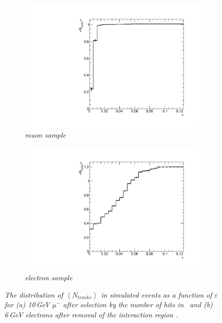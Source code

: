 \begin{figure}[H]
	\centering
	\begin{subfigure}{0.5\textwidth}
		\centering
		\includegraphics[width=.90\linewidth]{ECAL/plots/muon-sys.pdf}
		\caption{\label{fig:muonhistsys} \sl muon sample}
	\end{subfigure}%
	\begin{subfigure}{0.5\textwidth}
		\centering
		\includegraphics[width=.90\linewidth]{ECAL/plots/electron-sys.pdf}
		\caption{\label{fig:ehistsys} \sl electron sample}
	\end{subfigure}
	\caption{\label{fig:muehistsys} \sl The distribution of $\left<N_{tracks}\right>$ in simulated events as a function of $\varepsilon$ for  \textit{(a)} 10\,GeV $\mathrm{\mu}^-$ after selection by the number of hits in \ecal\ and \textit{(b)} 6\,GeV electrons after removal of the interaction region .}
\end{figure}

